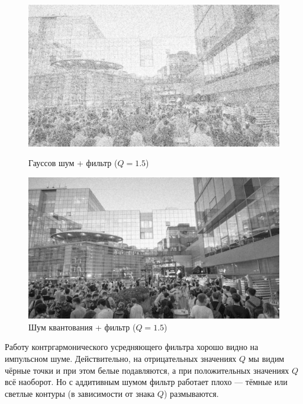 \documentclass[a4paper]{article}
\begin{document}
\begin{figure}[H]
    \begin{minipage}{0.49\textwidth}
        \centering \includegraphics[width=\textwidth]{images/2_low_filters/gaussian - contrharmonic (Q=1.5).jpg}
        \caption{Гауссов шум + фильтр ($Q = 1.5$)}
    \end{minipage}\hfill
    \begin{minipage}{0.49\textwidth}
        \centering \includegraphics[width=\textwidth]{images/2_low_filters/poisson - contrharmonic (Q=1.5).jpg}
        \caption{Шум квантования + фильтр ($Q = 1.5$)}
    \end{minipage}
\end{figure}
\noindent Работу контргармонического усредняющего фильтра хорошо видно на импульсном шуме. Действительно, на отрицательных значениях $Q$ мы видим чёрные точки и при этом белые подавляются, а при положительных значениях $Q$ всё наоборот. Но с аддитивным шумом фильтр работает плохо --- тёмные или светлые контуры (в зависимости от знака $Q$) размываются. \pagebreak
\end{document}
